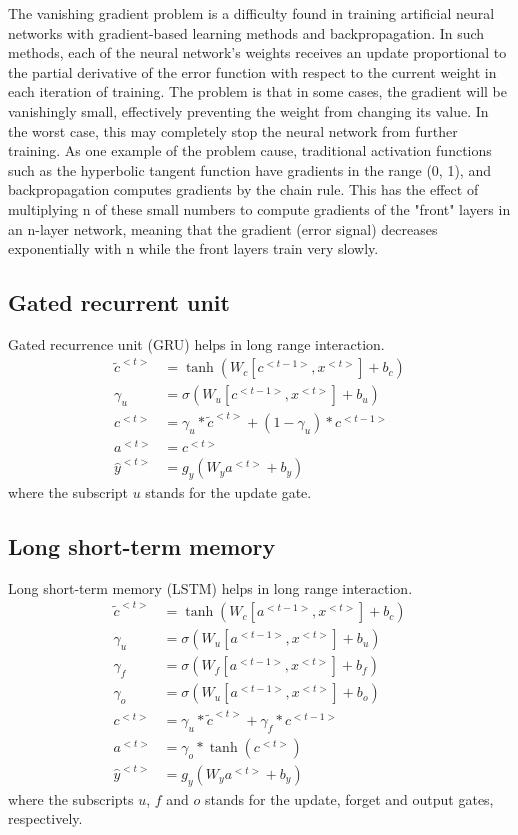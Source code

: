 \documentclass{book}
\begin{document}
The vanishing gradient problem is a difficulty found in training artificial neural networks with gradient-based learning methods and backpropagation. In such methods, each of the neural network's weights receives an update proportional to the partial derivative of the error function with respect to the current weight in each iteration of training. The problem is that in some cases, the gradient will be vanishingly small, effectively preventing the weight from changing its value. In the worst case, this may completely stop the neural network from further training. As one example of the problem cause, traditional activation functions such as the hyperbolic tangent function have gradients in the range (0, 1), and backpropagation computes gradients by the chain rule. This has the effect of multiplying n of these small numbers to compute gradients of the "front" layers in an n-layer network, meaning that the gradient (error signal) decreases exponentially with n while the front layers train very slowly. 


\subsection{Gated recurrent unit}
Gated recurrence unit (GRU) helps in long range interaction.
\begin{align*}
\tilde{c}^{<t>} &= \tanh(W_{c}[c^{<t-1>},x^{<t>}] + b_{c}) \\
\gamma_u     &= \sigma	(W_{u}[c^{<t-1>},x^{<t>}] + b_{u})\\
c^{<t>} &= \gamma_u \ast  \tilde{c}^{<t>} + (1 - \gamma_u) \ast c^{<t-1>} \\
a^{<t>} &= c^{<t>} \\
\hat{y}^{<t>} &= g_y(W_{y}a^{<t>} +b_{y})
\end{align*}
where the subscript $u$ stands for the update gate.

\subsection{Long short-term memory}
Long short-term memory (LSTM) helps in long range interaction.
\begin{align*}
\tilde{c}^{<t>} &= \tanh(W_{c}[a^{<t-1>},x^{<t>}] + b_{c}) \\
\gamma_u     &= \sigma	(W_{u}[a^{<t-1>},x^{<t>}] + b_{u})\\
\gamma_f      &= \sigma	(W_{f}[a^{<t-1>},x^{<t>}] + b_{f})\\
\gamma_o     &= \sigma	(W_{u}[a^{<t-1>},x^{<t>}] + b_{o})\\
c^{<t>} &= \gamma_u \ast  \tilde{c}^{<t>} + \gamma_f \ast c^{<t-1>} \\
a^{<t>} &= \gamma_o \ast  \tanh(c^{<t>}) \\
\hat{y}^{<t>} &= g_y(W_{y}a^{<t>} +b_{y})
\end{align*}
where the subscripts $u$, $f$ and $o$ stands for the update, forget and output gates, respectively.
\end{document}
